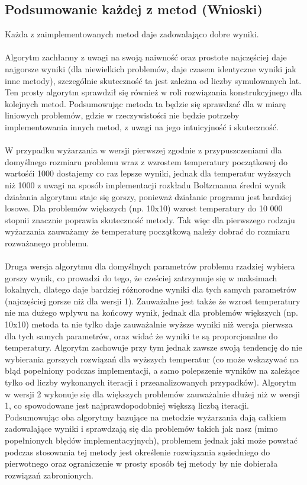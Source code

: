 \documentclass{article}
\begin{document}
\subsection{Podsumowanie każdej z metod (Wnioski)}
Każda z zaimplementowanych metod daje zadowalająco dobre wyniki.
\\\\Algorytm zachłanny z uwagi na swoją naiwność oraz prostote najczęściej daje najgorsze wyniki (dla niewielkich problemów, daje czasem identyczne wyniki jak inne metody), szczególnie skuteczność ta jest zależna od liczby symulowanych lat. Ten prosty algorytm sprawdził się również w roli rozwiązania konstrukcyjnego dla kolejnych metod. Podsumowując metoda ta będzie się sprawdzać dla w miarę liniowych problemów, gdzie w rzeczywistości nie będzie potrzeby implementowania innych metod, z uwagi na jego intuicyjność i skuteczność.
\\\\W przypadku wyżarzania w wersji pierwszej zgodnie z przypuszczeniami dla domyślnego rozmiaru problemu wraz z wzrostem temperatury początkowej do wartośći 1000 dostajemy co raz lepsze wyniki, jednak dla temperatur wyższych niż 1000 z uwagi na sposób implementacji rozkładu Boltzmanna średni wynik działania algorytmu staje się gorszy, ponieważ działanie programu jest bardziej losowe. Dla problemów większych (np. 10x10) wzrost temperatury do 10 000 stopnii znacznie poprawia skuteczność metody. Tak więc dla pierwszego rodzaju wyżarzania zauważamy że temperaturę początkową należy dobrać do rozmiaru rozważanego problemu.
\\\\Druga wersja algorytmu dla domyślnych parametrów problemu rzadziej wybiera gorszy wynik, co prowadzi do tego, że cześciej zatrzymuje się w maksimach lokalnych, dlatego daje bardziej różnorodne wyniki dla tych samych parametrów (najczęściej gorsze niż dla wersji 1). Zauważalne jest także że wzrost temperatury nie ma dużego wpływu na końcowy wynik, jednak dla problemów większych (np. 10x10) metoda ta nie tylko daje zauważalnie wyższe wyniki niż wersja pierwsza dla tych samych parametrów, oraz widać że wyniki te są proporcjonalne do temperatury. Algorytm zachowuje przy tym jednak zawsze swoją tendencję do nie wybierania gorszych rozwiązań dla wyższych temperatur (co może wskazywać na błąd popełniony podczas implementacji, a samo polepszenie wyników na zależące tylko od liczby wykonanych iteracji i przeanalizowanych przypadków). Algorytm w wersji 2 wykonuje się dla większych problemów zauważalnie dłużej niż w wersji 1, co spowodowane jest najprawdopodobniej większą liczbą iteracji. Podsumowując oba algorytmy bazujące na metodzie wyżarzania dają całkiem zadowalające wyniki i sprawdzają się dla problemów takich jak nasz (mimo popełnionych błędów implementacyjnych), problemem jednak jaki może powstać podczas stosowania tej metody jest określenie rozwiązania sąsiedniego do pierwotnego oraz ograniczenie w prosty sposób tej metody by nie dobierała rozwiązań zabronionych.
\end{document}
